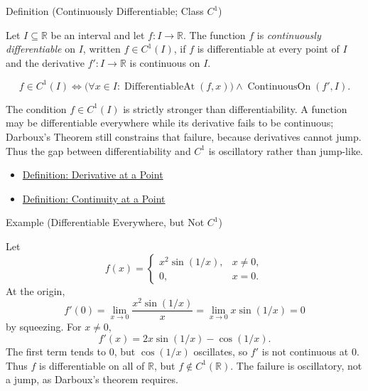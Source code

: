\begin{definitionbox}{Definition (Continuously Differentiable; Class \(C^1\))}
\begin{definition}
\label{def:class-c1}
Let \(I\subseteq\mathbb{R}\) be an interval and let \(f:I\to\mathbb{R}\). The function \(f\) is \emph{continuously differentiable} on \(I\), written \(f\in C^1(I)\), if \(f\) is differentiable at every point of \(I\) and the derivative \(f':I\to\mathbb{R}\) is continuous on \(I\).
\end{definition}
\end{definitionbox}

\begin{remark*}
\[
  f\in C^1(I)
  \Longleftrightarrow
  \bigl(\forall x\in I:\operatorname{DifferentiableAt}(f,x)\bigr)
  \land
  \operatorname{ContinuousOn}(f',I).
\]
\end{remark*}

\begin{remark*}[Interpretation]
The condition \(f\in C^1(I)\) is strictly stronger than differentiability. A function may be differentiable everywhere while its derivative fails to be continuous; Darboux's Theorem still constrains that failure, because derivatives cannot jump. Thus the gap between differentiability and \(C^1\) is oscillatory rather than jump-like.
\end{remark*}

\begin{dependencies}
\begin{itemize}
  \item \hyperref[def:derivative-at-a-point]{Definition: Derivative at a Point}
  \item \hyperref[def:continuous-at-point]{Definition: Continuity at a Point}
\end{itemize}
\end{dependencies}

\begin{definitionbox}{Example (Differentiable Everywhere, but Not \(C^1\))}
\label{ex:x2sin}
\begin{remark*}
Let
\[
  f(x)=
  \begin{cases}
    x^2\sin(1/x), & x\neq 0,\\
    0, & x=0.
  \end{cases}
\]
At the origin,
\[
  f'(0)=\lim_{x\to0}\frac{x^2\sin(1/x)}{x}
  =
  \lim_{x\to0}x\sin(1/x)=0
\]
by squeezing. For \(x\neq0\),
\[
  f'(x)=2x\sin(1/x)-\cos(1/x).
\]
The first term tends to \(0\), but \(\cos(1/x)\) oscillates, so \(f'\) is
not continuous at \(0\). Thus \(f\) is differentiable on all of
\(\mathbb{R}\), but \(f\notin C^1(\mathbb{R})\). The failure is oscillatory,
not a jump, as Darboux's theorem requires.
\end{remark*}
\end{definitionbox}

